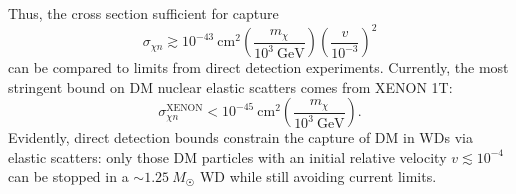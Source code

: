 \documentclass[preprintnumbers,amsmath,amssymb,prd,superscriptaddress]{revtex4}
\newcommand{\GeV}{\text{GeV}}
\newcommand{\cm}{\text{cm}}
\def\r{\right)}
\def\l{\left(}
\begin{document}
Thus, the cross section sufficient for capture
\begin{equation}
\sigma_{\chi n} \gtrsim 10^{-43} ~\cm^2 \l \frac{m_\chi}{10^{3} ~\GeV} \r \l \frac{v}{10^{-3}} \r^2
\end{equation}
can be compared to limits from direct detection experiments. 
Currently, the most stringent bound on DM nuclear elastic scatters comes from XENON 1T:
\begin{equation}
\label{eq:xenon}
\sigma^\text{XENON}_{\chi n} < 10^{-45} ~\text{cm}^2 \l \frac{m_\chi}{10^3 ~\GeV} \r.
\end{equation}
Evidently, direct detection bounds constrain the capture of DM in WDs via elastic scatters: only those DM particles with an initial relative velocity $v \lesssim 10^{-4}$ can be stopped in a $\sim 1.25 ~M_{\astrosun}$ WD while still avoiding current limits. 
\end{document}
